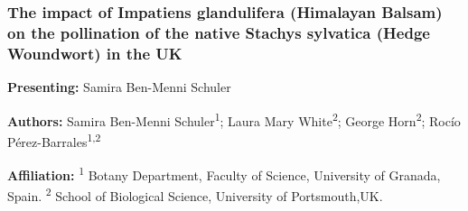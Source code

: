 \documentclass[
  letterpaper,
  DIV=11,
  numbers=noendperiod]{scrartcl}
\begin{document}
\subsubsection{The impact of Impatiens glandulifera (Himalayan Balsam)
on the pollination of the native Stachys sylvatica (Hedge Woundwort) in
the
UK}\label{the-impact-of-impatiens-glandulifera-himalayan-balsam-on-the-pollination-of-the-native-stachys-sylvatica-hedge-woundwort-in-the-uk}

\textbf{Presenting:} Samira Ben-Menni Schuler

\textbf{Authors:} Samira Ben-Menni Schuler\textsuperscript{1}; Laura
Mary White\textsuperscript{2}; George Horn\textsuperscript{2}; Rocío
Pérez-Barrales\textsuperscript{1,2}

\textbf{Affiliation:} \textsuperscript{1} Botany Department, Faculty of
Science, University of Granada, Spain. \textsuperscript{2} School of
Biological Science, University of Portsmouth,UK.
\end{document}
